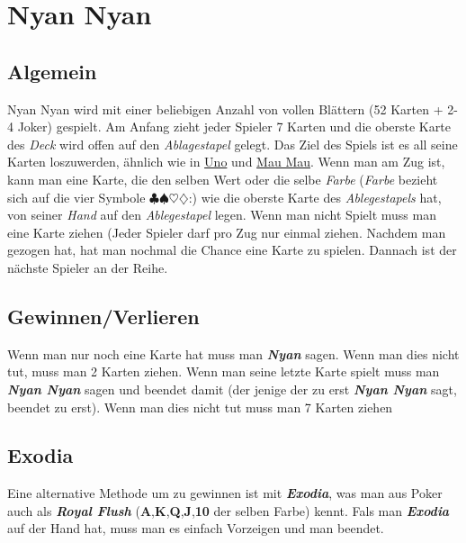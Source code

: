 \documentclass[10pt,a4paper]{article}
\date{}
\begin{document}
\section{Nyan Nyan}\label{nyan-nyan}

\subsection{Algemein}\label{algemein}

Nyan Nyan wird mit einer beliebigen Anzahl von vollen Blättern (52
Karten + 2-4 Joker) gespielt. Am Anfang zieht jeder Spieler 7 Karten und
die oberste Karte des \emph{Deck} wird offen auf den \emph{Ablagestapel}
gelegt. Das Ziel des Spiels ist es all seine Karten loszuwerden, ähnlich
wie in \href{https://de.wikipedia.org/wiki/Uno_(Kartenspiel)}{Uno} und
\href{https://de.wikipedia.org/wiki/Mau-Mau_(Kartenspiel)}{Mau Mau}.
Wenn man am Zug ist, kann man eine Karte, die den selben Wert oder die
selbe \emph{Farbe} (\emph{Farbe} bezieht sich auf die vier Symbole
$\clubsuit\spadesuit\heartsuit\diamondsuit$:) wie die oberste Karte des
\emph{Ablegestapels} hat, von seiner \emph{Hand} auf den
\emph{Ablegestapel} legen. Wenn man nicht Spielt muss man eine Karte
ziehen (Jeder Spieler darf pro Zug nur einmal ziehen. Nachdem man
gezogen hat, hat man nochmal die Chance eine Karte zu spielen. Dannach
ist der nächste Spieler an der Reihe.

\subsection{Gewinnen/Verlieren}\label{gewinnenverlieren}

Wenn man nur noch eine Karte hat muss man \textbf{\emph{Nyan}} sagen.
Wenn man dies nicht tut, muss man 2 Karten ziehen. Wenn man seine letzte
Karte spielt muss man \textbf{\emph{Nyan Nyan}} sagen und beendet damit
(der jenige der zu erst \textbf{\emph{Nyan Nyan}} sagt, beendet zu
erst). Wenn man dies nicht tut muss man 7 Karten ziehen

\subsection{Exodia}\label{exodia}

Eine alternative Methode um zu gewinnen ist mit \textbf{\emph{Exodia}},
was man aus Poker auch als \textbf{\emph{Royal Flush}}
(\textbf{A},\textbf{K},\textbf{Q},\textbf{J},\textbf{10} der selben
Farbe) kennt. Fals man \textbf{\emph{Exodia}} auf der Hand hat, muss man
es einfach Vorzeigen und man beendet.
\end{document}
